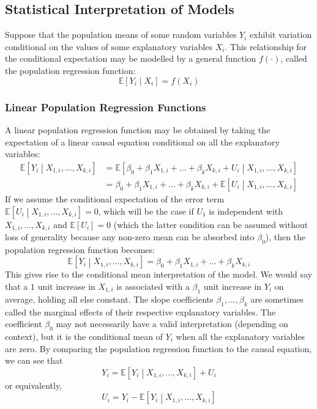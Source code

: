 \documentclass[11pt]{report} %
\begin{document}
\subsection{Statistical Interpretation of Models}

Suppose that the population means of some random variables $Y_{i}$ exhibit variation conditional on the values of some explanatory variables $X_{i}$. This relationship for the conditional expectation may be modelled by a general function $f\left(\cdot\right)$, called the population regression function:
\begin{equation}
\mathbb{E}\left[Y_{i}\middle|X_{i}\right] = f\left(X_{i}\right)
\end{equation}

\subsubsection{Linear Population Regression Functions}

A linear population regression function may be obtained by taking the expectation of a linear causal equation conditional on all the explanatory variables:
\begin{align}
\mathbb{E}\left[Y_{i}\middle|X_{1, i}, \dots, X_{k, i}\right] &= \mathbb{E}\left[\beta_{0} + \beta_{1}X_{1, i} + \dots + \beta_{k}X_{k, i} + U_{i}\middle|X_{1, i}, \dots, X_{k, i}\right] \\
&= \beta_{0} + \beta_{1}X_{1, i} + \dots + \beta_{k}X_{k, i} + \mathbb{E}\left[U_{i}\middle|X_{1, i}, \dots, X_{k, i}\right]
\end{align}
If we assume the conditional expectation of the error term $\mathbb{E}\left[U_{i}\middle|X_{1, i}, \dots, X_{k, i}\right] = 0$, which will be the case if $U_{1}$ is independent with $X_{1, i}, \dots, X_{k, i}$ and $\mathbb{E}\left[U_{i}\right] = 0$ (which the latter condition can be assumed without loss of generality because any non-zero mean can be absorbed into $\beta_{0}$), then the population regression function becomes:
\begin{equation}
\mathbb{E}\left[Y_{i}\middle|X_{1, i}, \dots, X_{k, i}\right] = \beta_{0} + \beta_{1}X_{1, i} + \dots + \beta_{k}X_{k, i}
\end{equation}
This gives rise to the conditional mean interpretation of the model. We would say that a $1$ unit increase in $X_{1, i}$ is associated with a $\beta_{1}$ unit increase in $Y_{i}$ on average, holding all else constant. The slope coefficients $\beta_{1}, \dots, \beta_{k}$ are sometimes called the marginal effects of their respective explanatory variables. The coefficient $\beta_{0}$ may not necessarily have a valid interpretation (depending on context), but it is the conditional mean of $Y_{i}$ when all the explanatory variables are zero. By comparing the population regression function to the causal equation, we can see that
\begin{equation}
Y_{i} = \mathbb{E}\left[Y_{i}\middle|X_{1, i}, \dots, X_{k, i}\right] + U_{i}
\end{equation}
or equivalently,
\begin{equation}
U_{i} = Y_{i} - \mathbb{E}\left[Y_{i}\middle|X_{1, i}, \dots, X_{k, i}\right]
\end{equation}
\end{document}
